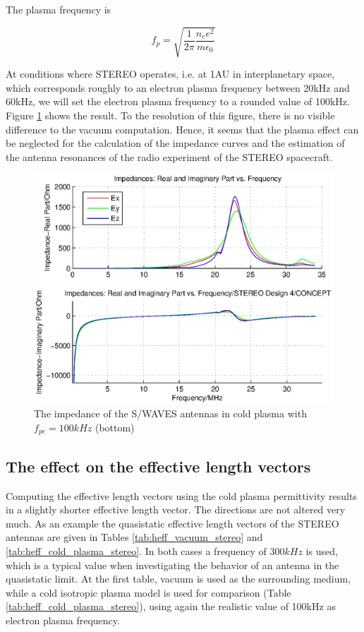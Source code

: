 \documentclass[a4paper,11pt]{article}
\begin{document}
The plasma frequency is

\begin{equation}\label{Plasma frequency}
    f_p=\sqrt{\frac{1}{2\pi}{\frac{n_e e^2}{ m \epsilon_0}}}
\end{equation}

At conditions where STEREO operates, i.e. at 1AU in interplanetary space, which corresponds roughly to an electron plasma frequency between 20kHz and 60kHz, we will set the electron plasma frequency to a rounded value of 100kHz. Figure \ref{fig:imp_stereo_fix_100kHz} shows the result. To the resolution of this figure, there is no visible difference to the vacuum computation. Hence, it seems that the plasma effect can be neglected for the calculation of the impedance curves and the estimation of the antenna resonances of the radio experiment of the STEREO spacecraft.


\begin{figure}
\begin{center}
\includegraphics[width=11.5cm]{impedance_stereo_pl_100khz.eps}
  \caption{The impedance of the S/WAVES antennas in cold plasma with $f_{pe}=100kHz$ (bottom)}\label{fig:imp_stereo_fix_100kHz}
  \end{center}
\end{figure}

\subsection{The effect on the effective length vectors}
Computing the effective length vectors using the cold plasma permittivity results in a slightly shorter effective length vector. The directions are not altered very much. As an example the quasistatic effective length vectors of the STEREO antennas are given in Tables \ref{tab:heff_vacuum_stereo} and \ref{tab:heff_cold_plasma_stereo}. In both cases a frequency of $300kHz$ is used, which is a typical value when investigating the behavior of an antenna in the quasistatic limit. At the first table, vacuum is used as the surrounding medium, while a cold isotropic plasma model is used for comparison (Table \ref{tab:heff_cold_plasma_stereo}), using again the realistic value of 100kHz as electron plasma frequency.\\
\end{document}
